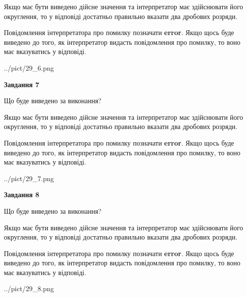 \documentclass[12pt, ukrainian]{article}
\begin{document}
{\begin {Large}
Якщо має бути виведено дійсне значення та інтерпретатор має здійснювати його округлення, 
то у відповіді достатньо правильно вказати два дробових розряди.

Повідомлення інтерпретатора про помилку позначати \textbf{error}.
Якщо щось буде виведено до того, як інтерпретатор видасть повідомлення про помилку, 
то воно має вказуватись у відповіді. \par

\begin{center}
	{../pict/29_6.png}
\end{center}
\newpage

{\begin {center}\textbf{Завдання 7}\end {center}}\par
Що буде виведено за виконання? \par

Якщо має бути виведено дійсне значення та інтерпретатор має здійснювати його округлення, 
то у відповіді достатньо правильно вказати два дробових розряди.

Повідомлення інтерпретатора про помилку позначати \textbf{error}.
Якщо щось буде виведено до того, як інтерпретатор видасть повідомлення про помилку, 
то воно має вказуватись у відповіді. \par

\begin{center}
	{../pict/29_7.png}
\end{center}
\newpage

{\begin {center}\textbf{Завдання 8}\end {center}}\par
Що буде виведено за виконання? \par

Якщо має бути виведено дійсне значення та інтерпретатор має здійснювати його округлення, 
то у відповіді достатньо правильно вказати два дробових розряди.

Повідомлення інтерпретатора про помилку позначати \textbf{error}.
Якщо щось буде виведено до того, як інтерпретатор видасть повідомлення про помилку, 
то воно має вказуватись у відповіді. \par

\begin{center}
	{../pict/29_8.png}
\end{center}
\newpage


\end{Large}}
\end{document}

